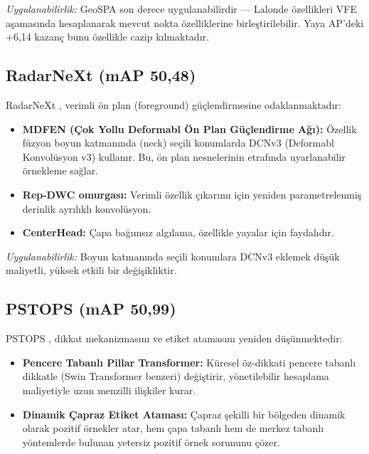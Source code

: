 \documentclass[a4paper,11pt]{article}
\begin{document}
\noindent
\textit{Uygulanabilirlik:} GeoSPA son derece uygulanabilirdir --- Lalonde özellikleri VFE aşamasında hesaplanarak mevcut nokta özelliklerine birleştirilebilir. Yaya AP'deki +6{,}14 kazanç bunu özellikle cazip kılmaktadır.

\subsection{RadarNeXt (mAP 50{,}48)}

RadarNeXt \cite{radarnext}, verimli ön plan (foreground) güçlendirmesine odaklanmaktadır:

\begin{itemize}[nosep]
    \item \textbf{MDFEN (Çok Yollu Deformabl Ön Plan Güçlendirme Ağı):} Özellik füzyon boyun katmanında (neck) seçili konumlarda DCNv3 (Deformabl Konvolüsyon v3) kullanır. Bu, ön plan nesnelerinin etrafında uyarlanabilir örnekleme sağlar.
    \item \textbf{Rep-DWC omurgası:} Verimli özellik çıkarımı için yeniden parametrelenmiş derinlik ayrılıklı konvolüsyon.
    \item \textbf{CenterHead:} Çapa bağımsız algılama, özellikle yayalar için faydalıdır.
\end{itemize}

\noindent
\textit{Uygulanabilirlik:} Boyun katmanında seçili konumlara DCNv3 eklemek düşük maliyetli, yüksek etkili bir değişikliktir.

\subsection{PSTOPS (mAP 50{,}99)}

PSTOPS \cite{pstops}, dikkat mekanizmasını ve etiket atamasını yeniden düşünmektedir:

\begin{itemize}[nosep]
    \item \textbf{Pencere Tabanlı Pillar Transformer:} Küresel öz-dikkati pencere tabanlı dikkatle (Swin Transformer benzeri) değiştirir, yönetilebilir hesaplama maliyetiyle uzun menzilli ilişkiler kurar.
    \item \textbf{Dinamik Çapraz Etiket Ataması:} Çapraz şekilli bir bölgeden dinamik olarak pozitif örnekler atar, hem çapa tabanlı hem de merkez tabanlı yöntemlerde bulunan yetersiz pozitif örnek sorununu çözer.
\end{itemize}
\end{document}
